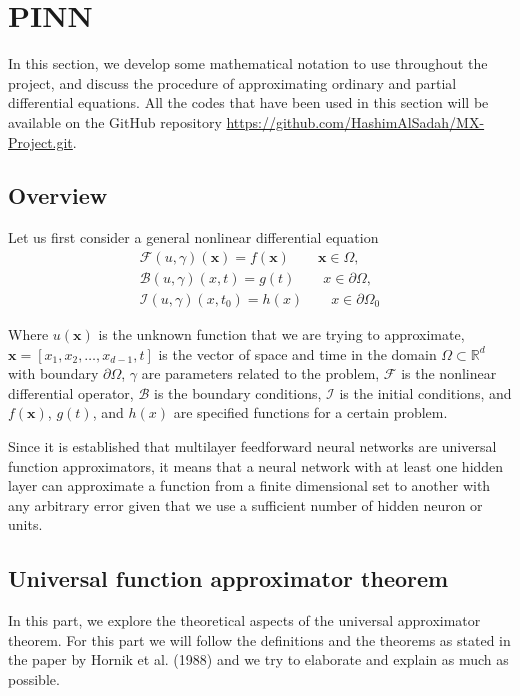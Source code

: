 \documentclass[a4paper,12pt]{article}
\theoremstyle{definition}
\begin{document}
\section{PINN}
In this section, we develop some mathematical notation to use throughout the project, 
and discuss the procedure of approximating ordinary and partial differential equations. All the 
codes that have been used in this section will be available on the GitHub repository 
\url{https://github.com/HashimAlSadah/MX-Project.git}.

\subsection{Overview}
Let us first consider a general nonlinear differential equation
\begin{equation}\label{general_PDE}
\begin{aligned}
\mathcal{F}(u, \gamma)(\mathbf{x}) = f(\mathbf{x}) \qquad \mathbf{x} \in  \Omega,\\
\mathcal{B}(u, \gamma)(x, t) = g(t) \qquad x \in \partial{\Omega}, \\
\mathcal{I}(u, \gamma)(x, t_0) = h(x) \qquad x \in \partial{\Omega_0}
\end{aligned}
\end{equation}

Where $u(\mathbf{x})$ is the unknown function that we are trying to approximate, 
$\mathbf{x} = [ x_1, x_2, \dots, x_{d-1}, t]$ is the vector of space and time 
in the domain $\Omega \subset \mathbb{R}^d$  with boundary $\partial{\Omega}$, 
$\gamma$ are parameters related to the problem, $\mathcal{F}$ is the nonlinear 
differential operator, $\mathcal{B}$ is the boundary conditions, $\mathcal{I}$ is 
the initial conditions, and $f(\mathbf{x})$, $g(t)$, and $h(x)$ are specified 
functions for a certain problem. 

Since it is established that multilayer feedforward neural networks 
are universal function approximators\cite{hornik1989multilayer}, it means that 
a neural network with at least one hidden layer can approximate a function 
from a finite dimensional set to another with 
any arbitrary error given that we use a sufficient number of hidden neuron or units.

\subsection{Universal function approximator theorem}
In this part, we explore the theoretical aspects of the universal approximator theorem.
For this part we will follow the definitions and the theorems as stated in the paper 
by Hornik et al. (1988) and we try to elaborate and explain as much as possible. 
\end{document}

